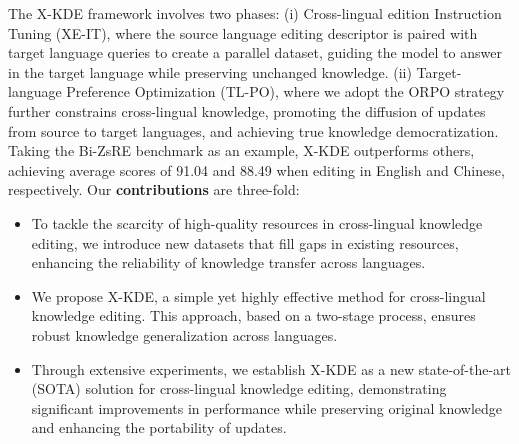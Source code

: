 The X-KDE framework involves two phases: (i) Cross-lingual edition Instruction Tuning (XE-IT), where the source language editing descriptor is paired with target language queries to create a parallel dataset, guiding the model to answer in the target language while preserving unchanged knowledge. (ii) Target-language Preference Optimization (TL-PO), where we adopt the ORPO strategy~\cite{hong2403orpo} further constrains cross-lingual knowledge, promoting the diffusion of updates from source to target languages, and achieving true knowledge democratization. Taking the Bi-ZsRE benchmark as an example, X-KDE outperforms others, achieving average scores of 91.04 and 88.49 when editing in English and Chinese, respectively. Our \textbf{contributions} are three-fold:
\begin{itemize}
    \item To tackle the scarcity of high-quality resources in cross-lingual knowledge editing, we introduce new datasets that fill gaps in existing resources, enhancing the reliability of knowledge transfer across languages.
    \item We propose X-KDE, a simple yet highly effective method for cross-lingual knowledge editing. This approach, based on a two-stage process, ensures robust knowledge generalization across languages.
    \item Through extensive experiments, we establish X-KDE as a new state-of-the-art (SOTA) solution for cross-lingual knowledge editing, demonstrating significant improvements in performance while preserving original knowledge and enhancing the portability of updates.
\end{itemize}